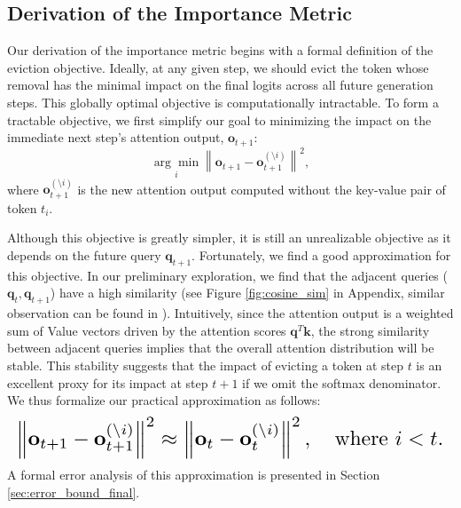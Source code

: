 \subsection{Derivation of the Importance Metric}
Our derivation of the importance metric begins with a formal definition of the eviction objective. Ideally, at any given step, we should evict the token whose removal has the minimal impact on the final logits across all future generation steps. This globally optimal objective is computationally intractable. To form a tractable objective, we first simplify our goal to minimizing the impact on the immediate next step's attention output, \( \mathbf{o}_{t+1} \):
\begin{equation}
\label{eq:next_step_objective}
\underset{i}{\arg\min} \left\| \mathbf{o}_{t+1} - \mathbf{o}_{t+1}^{(\setminus i)} \right\|^2,
\end{equation}
where \( \mathbf{o}_{t+1}^{(\setminus i)} \) is the new attention output computed without the key-value pair of token \( t_i \).

Although this objective is greatly simpler, it is still an unrealizable objective as it depends on the future query \( \mathbf{q}_{t+1} \).
Fortunately, we find a good approximation for this objective.
In our preliminary exploration, we find that the adjacent queries (\(\mathbf{q}_t, \mathbf{q}_{t+1}\)) have a high similarity (see Figure \ref{fig:cosine_sim} in Appendix, similar observation can be found in \citet{calidrop}). Intuitively, since the attention output is a weighted sum of Value vectors driven by the attention scores \( \mathbf{q}^T \mathbf{k} \), the strong similarity between adjacent queries implies that the overall attention distribution will be stable. This stability suggests that the impact of evicting a token at step $t$ is an excellent proxy for its impact at step $t+1$ if we omit the softmax denominator.
We thus formalize our practical approximation as follows:
\begin{equation}
\label{eq:greedy_objective}
\resizebox{\columnwidth}{!}{$
\left\| \mathbf{o}_{t+1} - \mathbf{o}_{t+1}^{(\setminus i)} \right\|^2 \approx \left\| \mathbf{o}_{t} - \mathbf{o}_{t}^{(\setminus i)} \right\|^2, \quad \text{where} \ i < t.
$}
\end{equation}
A formal error analysis of this approximation is presented in Section \ref{sec:error_bound_final}.

